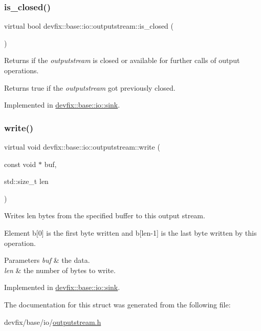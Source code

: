 \subsubsection{\texorpdfstring{is\+\_\+closed()}{is\_closed()}}
{\footnotesize\ttfamily virtual bool devfix\+::base\+::io\+::outputstream\+::is\+\_\+closed (\begin{DoxyParamCaption}{ }\end{DoxyParamCaption})\hspace{0.3cm}{\ttfamily [pure virtual]}}



Returns if the {\itshape outputstream} is closed or available for further calls of output operations. 

\begin{DoxyReturn}{Returns}
true if the {\itshape outputstream} got previously closed. 
\end{DoxyReturn}


Implemented in \hyperlink{structdevfix_1_1base_1_1io_1_1sink_a7d006bfd462ad29884aef9f6a7f40006}{devfix\+::base\+::io\+::sink}.

\mbox{\label{structdevfix_1_1base_1_1io_1_1outputstream_ac7e5fcd6883c7c8f53356a4eb8284c00}} 
\subsubsection{\texorpdfstring{write()}{write()}}
{\footnotesize\ttfamily virtual void devfix\+::base\+::io\+::outputstream\+::write (\begin{DoxyParamCaption}\item[{const void $\ast$}]{buf,  }\item[{std\+::size\+\_\+t}]{len }\end{DoxyParamCaption})\hspace{0.3cm}{\ttfamily [pure virtual]}}



Writes len bytes from the specified buffer to this output stream. 

Element b\mbox{[}0\mbox{]} is the first byte written and b\mbox{[}len-\/1\mbox{]} is the last byte written by this operation.


\begin{DoxyParams}{Parameters}
{\em buf} & the data. \\
\hline
{\em len} & the number of bytes to write. \\
\hline
\end{DoxyParams}


Implemented in \hyperlink{structdevfix_1_1base_1_1io_1_1sink_ae0edc765741de5514b24ccc17457ec96}{devfix\+::base\+::io\+::sink}.



The documentation for this struct was generated from the following file\+:\begin{DoxyCompactItemize}
\item 
devfix/base/io/\hyperlink{outputstream_8h}{outputstream.\+h}\end{DoxyCompactItemize}
